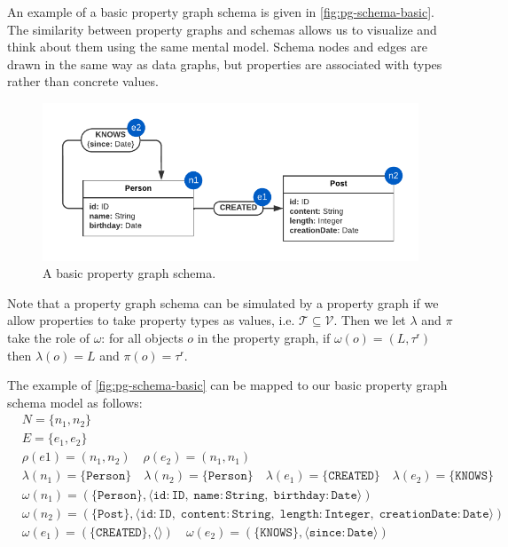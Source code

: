 \documentclass{report}
\theoremstyle{definition}
\newcommand{\ptypes}{\mathcal{T}}
\newcommand{\rtype}{\tau^\mathsf{r}}
\begin{document}
An example of a basic property graph schema is given in \autoref{fig:pg-schema-basic}. The similarity between property graphs and schemas allows us to visualize and think about them using the same mental model. Schema nodes and edges are drawn in the same way as data graphs, but properties are associated with types rather than concrete values.

\begin{figure}[t]
  \centering
  \includegraphics{figures/pg-schema-basic.pdf}
  \caption{A basic property graph schema.}
  \label{fig:pg-schema-basic}
\end{figure}

Note that a property graph schema can be simulated by a property graph if we allow properties to take property types as values, i.e. $\ptypes \subseteq \mathcal{V}$. Then we let $\lambda$ and $\pi$ take the role of $\omega$: for all objects $o$ in the property graph, if $\omega(o) = (L, \rtype)$ then $\lambda(o) = L$ and $\pi(o) = \rtype$.

The example of \autoref{fig:pg-schema-basic} can be mapped to our basic property graph schema model as follows:
\begin{align*}
  &N = \{n_1, n_2\}\\
  &E = \{e_1, e_2\}\\
  &\rho(e1) = (n_1, n_2) \quad \rho(e_2) = (n_1, n_1)\\
  &\lambda(n_1) = \{\texttt{Person}\} \quad \lambda(n_2) = \{\texttt{Person}\} \quad \lambda(e_1) = \{\texttt{CREATED}\} \quad \lambda(e_2) = \{\texttt{KNOWS}\}\\
  &\omega(n_1) = (\{\texttt{Person}\}, \langle \texttt{id} : \texttt{ID},\;\texttt{name} : \texttt{String},\;\texttt{birthday} : \texttt{Date} \rangle)\\
  &\omega(n_2) = (\{\texttt{Post}\}, \langle \texttt{id} : \texttt{ID},\;\texttt{content} : \texttt{String},\;\texttt{length} : \texttt{Integer},\;\texttt{creationDate} : \texttt{Date} \rangle)\\
  &\omega(e_1) = (\{\texttt{CREATED}\}, \langle\rangle) \quad \omega(e_2) = (\{\texttt{KNOWS}\}, \langle \texttt{since} : \texttt{Date} \rangle)
\end{align*}
\end{document}
